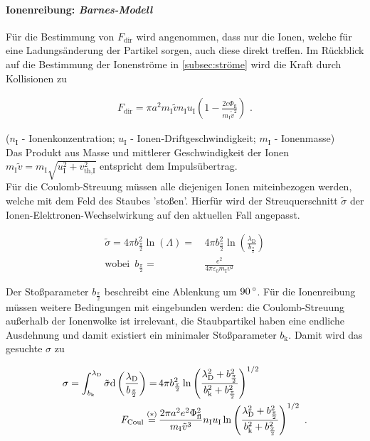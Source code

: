 \documentclass[numbers=noenddot,a4paper]{scrartcl}
\newcommand{\degree}{^\circ}
\newcommand{\diff}{\textnormal{d}}
\newcommand{\ix}[1]{_\text{#1}}
\newcommand{\tilt}[1]{\textit{#1}}
\begin{document}
				\paragraph{Ionenreibung: \tilt{Barnes-Modell}}
				
				Für die Bestimmung von $F\ix{dir}$ wird angenommen, dass nur die Ionen, welche für eine Ladungsänderung der Partikel sorgen, auch diese direkt treffen. Im Rückblick auf die Bestimmung der Ionenströme in \ref{subsec:ströme} wird die Kraft durch Kollisionen zu
				
					\begin{align}
						F\ix{dir}=\pi a^2m\ix{I}\tilde{v}n\ix{I}u\ix{I}\left(1-\frac{2e\Phi\ix{fl}}{m\ix{I}\tilde{v}^2}\right)\,\,.
					\end{align}
					
				($n\ix{I}$ - Ionenkonzentration; $u\ix{I}$ - Ionen-Driftgeschwindigkeit; $m\ix{I}$ - Ionenmasse)\\
				Das Produkt aus Masse und mittlerer Geschwindigkeit der Ionen $m\ix{I}\tilde{v}=m\ix{I}\sqrt{u\ix{I}^2+v\ix{th,I}^2}$ entspricht dem Impulsübertrag.\\
				Für die Coulomb-Streuung müssen alle diejenigen Ionen miteinbezogen werden, welche mit dem Feld des Staubes 'stoßen'. Hierfür wird der Streuquerschnitt $\tilde{\sigma}$ der Ionen-Elektronen-Wechselwirkung auf den aktuellen Fall angepasst.
				
					\begin{align}
						\tilde{\sigma}=4\pi b_{\frac{\pi}{2}}^2\ln\left(\Lambda\right)=&\,4\pi b_{\frac{\pi}{2}}^2\ln\left(\frac{\lambda\ix{D}}{b_{\frac{\pi}{2}}}\right) \\
						\text{wobei }\, b_{\frac{\pi}{2}}=&\,\frac{e^2}{4\pi\varepsilon\ix{0}m\ix{I}v^2} \nonumber
					\end{align}
					
				Der Stoßparameter $b_{\frac{\pi}{2}}$ beschreibt eine Ablenkung um $\unit[90]{\degree}$. Für die Ionenreibung müssen weitere Bedingungen mit eingebunden werden: die Coulomb-Streuung außerhalb der Ionenwolke ist irrelevant, die Staubpartikel haben eine endliche Ausdehnung und damit existiert ein minimaler Stoßparameter $b\ix{k}$. Damit wird das gesuchte $\sigma$ zu
				
					\begin{align}
						\sigma=\int_{b\ix{k}}^{\lambda\ix{D}}\tilde{\sigma}\diff\left(\frac{\lambda\ix{D}}{b_{\frac{\pi}{2}}}\right)=&\,4\pi b_{\frac{\pi}{2}}^2\ln\left(\frac{\lambda\ix{D}^2+b_{\frac{\pi}{2}}^2}{b\ix{k}^2+b_{\frac{\pi}{2}}^2}\right)^{1/2} \nonumber \\
						F\ix{Coul}\overset{(*)}{=}&\,\frac{2\pi a^2 e^2\Phi\ix{fl}^2}{m\ix{I}\tilde{v}^3}n\ix{I}u\ix{I}\ln\left(\frac{\lambda\ix{D}^2+b_{\frac{\pi}{2}}^2}{b\ix{k}^2+b_{\frac{\pi}{2}}^2}\right)^{1/2} \, \, .
					\end{align}
					
\end{document}
